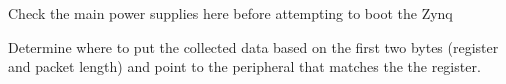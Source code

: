 
\begin{DoxyRefList}
\item[\label{todo__todo000001}%
\Hypertarget{todo__todo000001}%
Global \mbox{\hyperlink{group___s_d___main_ga840291bc02cba5474a4cb46a9b9566fe}{main}} (void)]Check the main power supplies here before attempting to boot the Zynq  
\item[\label{todo__todo000002}%
\Hypertarget{todo__todo000002}%
Global \mbox{\hyperlink{group___s_d___s_p_i___functions_ga8f8403c9f68c9a623486a29cf8715fda}{sd\+\_\+spi\+\_\+rx\+\_\+isr}} (struct \mbox{\hyperlink{structsd__spi__dev}{sd\+\_\+spi\+\_\+dev}} $\ast$dev)]Determine where to put the collected data based on the first two bytes (register and packet length) and point to the peripheral that matches the the register. 
\end{DoxyRefList}
